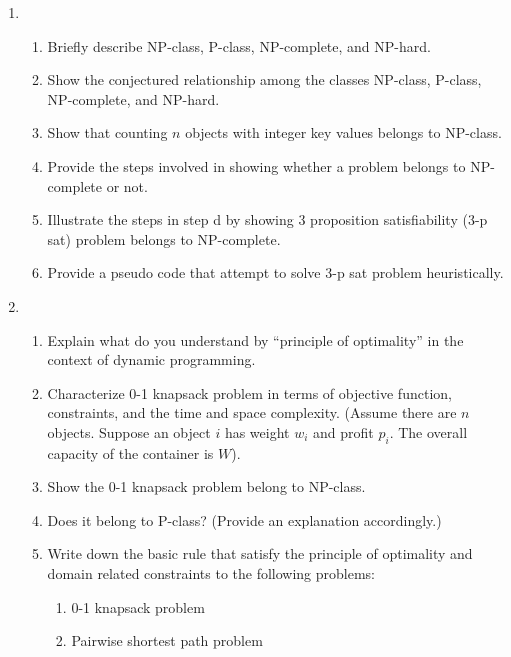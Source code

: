 \begin{enumerate}
	\item \begin{enumerate}
		\item Briefly describe NP-class, P-class, NP-complete, and NP-hard.
		\item Show the conjectured relationship among the classes NP-class, P-class, NP-complete, and NP-hard.
		\item Show that counting $n$ objects with integer key values belongs to NP-class.  
		\item Provide the steps involved in showing whether a problem belongs to NP-complete or not.
		\item Illustrate the steps in step d by showing 3 proposition satisfiability (3-p sat) problem belongs to NP-complete.
		\item Provide a pseudo code that attempt to solve 3-p sat problem heuristically.
	\end{enumerate}
	

	\item 	\begin{enumerate}
		\item 	Explain what do you understand by ``principle of optimality'' in the context of dynamic programming.
		\item Characterize 0-1 knapsack problem in terms of objective function, constraints, and the time and space complexity.  (Assume there are $n$ objects.  Suppose an object $i$ has weight $w_i$ and profit $p_i$.  The overall capacity of the container is $W$).
		\item Show the 0-1 knapsack problem belong to NP-class.
		\item Does it belong to P-class?  (Provide an explanation accordingly.)
		\item Write down the basic rule that satisfy the principle of optimality and domain related constraints to the following problems:
		\begin{enumerate}
			\item 0-1 knapsack problem
			\item Pairwise shortest path problem
		\end{enumerate}
	\end{enumerate}
	
	

\end{enumerate}
